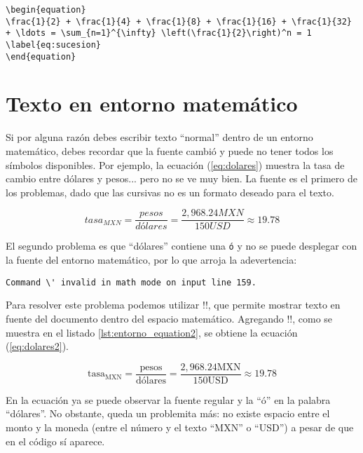 \begin{lstlisting}[style=latex,caption={Código para ecuación con referencia.},label=lst:entorno_equation]
\begin{equation}
\frac{1}{2} + \frac{1}{4} + \frac{1}{8} + \frac{1}{16} + \frac{1}{32} + \ldots = \sum_{n=1}^{\infty} \left(\frac{1}{2}\right)^n = 1
\label{eq:sucesion}
\end{equation}
\end{lstlisting}



\section{Texto en entorno matemático}
\label{sec:texto_en_entorno_matematico}



Si por alguna razón debes escribir texto ``normal'' dentro de un entorno matemático, debes recordar que la fuente cambió y puede no tener todos los símbolos disponibles. Por ejemplo, la ecuación (\ref{eq:dolares}) muestra la tasa de cambio entre dólares y pesos... pero no se ve muy bien. La fuente es el primero de los problemas, dado que las cursivas no es un formato deseado para el texto.

\begin{equation}
tasa_{MXN} = \frac{pesos}{dólares} = \frac{2,968.24 MXN}{150 USD} \approx 19.78
\label{eq:dolares}
\end{equation}

El segundo problema es que ``dólares'' contiene una \texttt{ó} y no se puede desplegar con la fuente del entorno matemático, por lo que arroja la adevertencia:

\begin{lstlisting}[style=advertencias]
Command \' invalid in math mode on input line 159.
\end{lstlisting}

Para resolver este problema podemos utilizar !\mbox!, que permite mostrar texto en fuente del documento dentro del espacio matemático. Agregando !\mbox!, como se muestra en el listado \ref{lst:entorno_equation2}, se obtiene la ecuación (\ref{eq:dolares2}).

\begin{equation}
\mbox{tasa}_{\mbox{MXN}} = \frac{\mbox{pesos}}{\mbox{dólares}} = \frac{2,968.24 \mbox{MXN}}{150 \mbox{USD}} \approx 19.78
\label{eq:dolares2}
\end{equation}

En la ecuación ya se puede observar la fuente regular y la ``ó'' en la palabra ``dólares''. No obstante, queda un problemita más: no existe espacio entre el monto y la moneda (entre el número y el texto ``MXN'' o ``USD'') a pesar de que en el código sí aparece.

